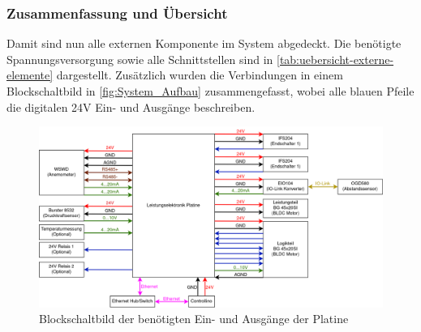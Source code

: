 \subsubsection{Zusammenfassung und Übersicht}
Damit sind nun alle externen Komponente im System abgedeckt. Die benötigte Spannungsversorgung sowie alle Schnittstellen sind in \autoref{tab:uebersicht-externe-elemente} dargestellt. Zusätzlich wurden die Verbindungen in einem Blockschaltbild in \autoref{fig:System_Aufbau} zusammengefasst, wobei alle blauen Pfeile die digitalen 24V Ein- und Ausgänge beschreiben.
\begin{figure}[H]
	\centering
	\includegraphics[width=1.0\textwidth]{images/System/Systemaufbau.drawio.png}
	\caption{Blockschaltbild der benötigten Ein- und Ausgänge der Platine}
	\label{fig:System_Aufbau}
\end{figure}
